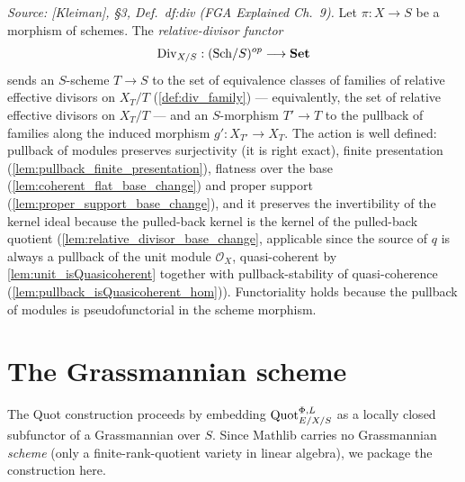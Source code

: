 \begin{definition}\leanok
  \label{def:div_functor}
  \textit{Source: [Kleiman], \S 3, Def.~df:div (FGA Explained Ch.~9).}
  Let \(\pi : X \to S\) be a morphism of schemes.  The
  \emph{relative-divisor functor}
  \[
    \operatorname{Div}_{X/S} : (\mathrm{Sch}/S)^{op} \longrightarrow \mathbf{Set}
  \]
  sends an \(S\)-scheme \(T \to S\) to the set of equivalence classes of
  families of relative effective divisors on \(X_T/T\)
  (\cref{def:div_family}) --- equivalently, the set of relative effective
  divisors on \(X_T/T\) --- and an \(S\)-morphism \(T' \to T\) to the
  pullback of families along the induced morphism
  \(g' : X_{T'} \to X_T\).  The action is well defined: pullback of modules
  preserves surjectivity (it is right exact), finite presentation
  (\cref{lem:pullback_finite_presentation}), flatness over the base
  (\cref{lem:coherent_flat_base_change}) and proper support
  (\cref{lem:proper_support_base_change}), and it preserves the
  invertibility of the kernel ideal because the pulled-back kernel is the
  kernel of the pulled-back quotient (\cref{lem:relative_divisor_base_change},
  applicable since the source of \(q\) is always a pullback of the unit
  module \(\mathcal O_X\), quasi-coherent by \cref{lem:unit_isQuasicoherent}
  together with pullback-stability of quasi-coherence
  (\cref{lem:pullback_isQuasicoherent_hom})).  Functoriality holds because
  the pullback of modules is pseudofunctorial in the scheme morphism.
\end{definition}

\section{The Grassmannian scheme}
\label{sec:grassmannian_scheme}

The Quot construction proceeds by embedding \(\operatorname{Quot}^{\Phi,L}_{E/X/S}\) as a
locally closed subfunctor of a Grassmannian over \(S\). Since Mathlib carries
no Grassmannian \emph{scheme} (only a finite-rank-quotient variety in
linear algebra), we package the construction here.

